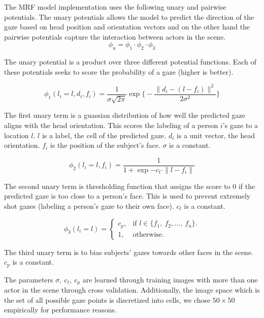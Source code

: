 \documentclass[10pt,twocolumn,letterpaper]{article}
\begin{document}
The MRF model implementation uses the following unary and pairwise potentials. The unary potentials allows the model to predict the direction of the gaze based on head position and orientation vectors and on the other hand the pairwise potentials capture the interaction between actors in the scene. \\

\begin{equation}
  \phi_u = \phi_1 \cdot \phi_2 \cdot \phi_3
\end{equation}

The unary potential is a product over three different potential functions. Each of these potentials seeks to score the probability of a gaze (higher is better).

\begin{equation}
  \phi_1(l_i = l, d_i, f_i) = \frac{1}{\sigma \sqrt{2 \pi}} \exp{\big\{-\frac{\|d_i - (l - f_i)\|^2}{2 \sigma^2}\big\}}
\end{equation}

The first unary term is a guassian distribution of how well the predicted gaze aligns with the head orientation. This scores the labeling of a person $i$'s gaze to a location $l$. $l$ is a label, the cell of the predicted gaze. $d_i$ is a unit vector, the head orientation. $f_i$ is the position of the subject's face. $\sigma$ is a constant.

\begin{equation}
  \phi_2(l_i = l, f_i) = \frac{1}{1 + \exp{-c_t \cdot \|l - f_i\|}}
\end{equation}

The second unary term is thresholding function that assigns the score to $0$ if the predicted gaze is too close to a person's face. This is used to prevent extremely shot gazes (labeling a person's gaze to their own face). $c_t$ is a constant.

\begin{equation}
  \phi_3(l_i = l) = \begin{cases}
    c_p, & \text{if $l \in \{f_1,\ f_2,\dots,\ f_n\}$}.\\
    1, & \text{otherwise}.
  \end{cases}
\end{equation}

The third unary term is to bias subjects' gazes towards other faces in the scene. $c_p$ is a constant.

The parameters $\sigma,\ c_t,\ c_p$ are learned through training images with more than one actor in the scene through cross validation.
Additionally, the image space which is the set of all possible gaze points is discretized into cells, we chose $50 \times 50$ empirically for performance reasons.
\end{document}
